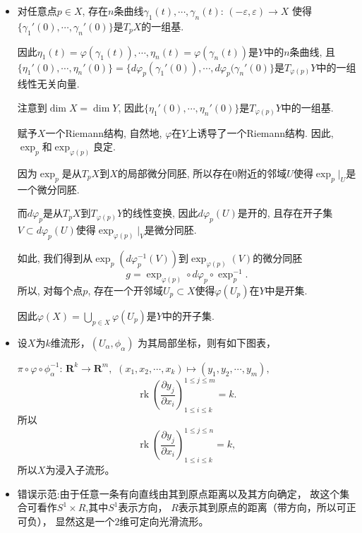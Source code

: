 \begin{itemize}
    \item[29.]
        对任意点$p\in X$, 存在$n$条曲线$\gamma_1(t),\cdots,\gamma_n(t)$: $(-\varepsilon,\varepsilon)\rightarrow X$ 使得$\{\gamma_1'(0),\cdots,\gamma_n'(0)\}$是$T_pX$的一组基.\par
        因此$\eta_1(t)=\varphi(\gamma_1(t)),\cdots,\eta_n(t)=\varphi(\gamma_n(t))$是$Y$中的$n$条曲线, 且$\{\eta_1'(0),\cdots,\eta_n'(0)\}=\{d\varphi_p(\gamma_1'(0)),\cdots,d\varphi_p(\gamma_n'(0)\}$是$T_{\varphi(p)}Y$中的一组线性无关向量.\par
        注意到$\dim X=\dim Y$, 因此$\{\eta_1'(0),\cdots,\eta_n'(0)\}$是$T_{\varphi(p)}Y$中的一组基.\par
        赋予$X$一个Riemann结构, 自然地, $\varphi$在$Y$上诱导了一个Riemann结构. 因此, $\exp_p$和$\exp_{\varphi(p)}$良定.\par
        因为$\exp_p$是从$T_pX$到$X$的局部微分同胚, 所以存在$0$附近的邻域$U$使得$\exp_p|_U$是一个微分同胚.\par
        而$d\varphi_p$是从$T_pX$到$T_{\varphi(p)}Y$的线性变换, 因此$d\varphi_p(U)$是开的, 且存在开子集$V\subset d\varphi_p(U)$使得$\exp_{\varphi(p)}|_V$是微分同胚.\par
        如此, 我们得到从$\exp_p(d\varphi^{-1}_p(V))$到$\exp_{\varphi(p)}(V)$的微分同胚 
            $$g=\exp_{\varphi(p)}\circ d\varphi_p \circ \exp_p^{-1}.$$
        所以, 对每个点$p$, 存在一个开邻域$U_p\subset X$使得$\varphi(U_p)$在$Y$中是开集.\par
        因此$\varphi(X)=\bigcup\limits_{p\in X}\varphi(U_p)$是$Y$中的开子集.
    
     \item[30.]
    设$X$为$k$维流形，$(U_{\alpha},\phi_{\alpha})$
    为其局部坐标，则有如下图表，
    
    
    $\pi\circ\varphi\circ\phi_{\alpha}^{-1}$: 
    $\mathbf{R}^k\rightarrow \mathbf{R}^m, $
    $(x_1,x_2,\cdots,x_k)\mapsto (y_1,y_2,\cdots,y_m),$
    $$\operatorname{rk}(\frac{\partial{y_{j}}}{\partial{x_{i}}})_{1\leq i \leq k}^{1\leq j\leq m}=k.$$
    所以$$\operatorname{rk}(\frac{\partial{y_{j}}}{\partial{x_{i}}})_{1\leq i \leq k}^{1\leq j\leq n}=k,$$
    所以$X$为浸入子流形。


    \item[31.]
    错误示范:由于任意一条有向直线由其到原点距离以及其方向确定，
    故这个集合可看作$S^1\times R$,其中$S^{1}$表示方向，
    $R$表示其到原点的距离（带方向，所以可正可负），
    显然这是一个$2$维可定向光滑流形。
    

\end{itemize}
